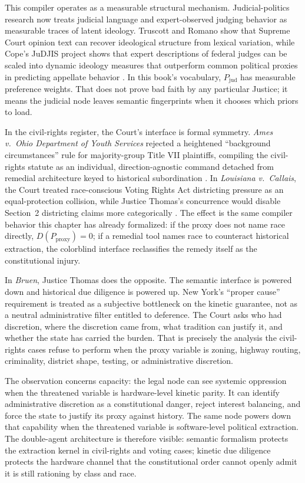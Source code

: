 This compiler operates as a measurable structural mechanism. Judicial-politics research now treats judicial language and expert-observed judging behavior as measurable traces of latent ideology. Truscott and Romano show that Supreme Court opinion text can recover ideological structure from lexical variation, while Cope's JuDJIS project shows that expert descriptions of federal judges can be scaled into dynamic ideology measures that outperform common political proxies in predicting appellate behavior \cite{truscott_romano_judicial_text_2026,cope_judjis_2025}. In this book's vocabulary, $P_{\text{jud}}$ has measurable preference weights. That does not prove bad faith by any particular Justice; it means the judicial node leaves semantic fingerprints when it chooses which priors to load.

In the civil-rights register, the Court's interface is formal symmetry. \textit{Ames v.\ Ohio Department of Youth Services} rejected a heightened ``background circumstances'' rule for majority-group Title VII plaintiffs, compiling the civil-rights statute as an individual, direction-agnostic command detached from remedial architecture keyed to historical subordination \cite{ames_ohio_dys_2025}. In \textit{Louisiana v.\ Callais}, the Court treated race-conscious Voting Rights Act districting pressure as an equal-protection collision, while Justice Thomas's concurrence would disable Section~2 districting claims more categorically \cite{louisiana_v_callais_2026}. The effect is the same compiler behavior this chapter has already formalized: if the proxy does not name race directly, $D(P_{\text{proxy}})=0$; if a remedial tool names race to counteract historical extraction, the colorblind interface reclassifies the remedy itself as the constitutional injury.

In \textit{Bruen}, Justice Thomas does the opposite. The semantic interface is powered down and historical due diligence is powered up. New York's ``proper cause'' requirement is treated as a subjective bottleneck on the kinetic guarantee, not as a neutral administrative filter entitled to deference. The Court asks who had discretion, where the discretion came from, what tradition can justify it, and whether the state has carried the burden. That is precisely the analysis the civil-rights cases refuse to perform when the proxy variable is zoning, highway routing, criminality, district shape, testing, or administrative discretion.

The observation concerns capacity: the legal node can see systemic oppression when the threatened variable is hardware-level kinetic parity. It can identify administrative discretion as a constitutional danger, reject interest balancing, and force the state to justify its proxy against history. The same node powers down that capability when the threatened variable is software-level political extraction. The double-agent architecture is therefore visible: semantic formalism protects the extraction kernel in civil-rights and voting cases; kinetic due diligence protects the hardware channel that the constitutional order cannot openly admit it is still rationing by class and race.

